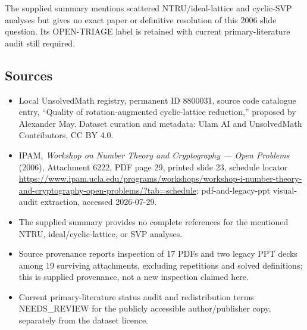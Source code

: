 \documentclass[11pt]{article}
\begin{document}
The supplied summary mentions scattered NTRU/ideal-lattice and cyclic-SVP analyses but gives no exact paper or definitive resolution of this 2006 slide question. Its OPEN-TRIAGE label is retained with current primary-literature audit still required.
\subsection{Sources}
\begin{itemize}
\item Local UnsolvedMath registry, permanent ID 8800031, source code catalogue entry, ``Quality of rotation-augmented cyclic-lattice reduction,'' proposed by Alexander May. Dataset curation and metadata: Ulam AI and UnsolvedMath Contributors, CC BY 4.0.
\item IPAM, \emph{Workshop on Number Theory and Cryptography --- Open Problems} (2006), Attachment 6222, PDF page 29, printed slide 23, schedule locator \url{https://www.ipam.ucla.edu/programs/workshops/workshop-i-number-theory-and-cryptography-open-problems/?tab=schedule}; pdf-and-legacy-ppt visual-audit extraction, accessed 2026-07-29.
\item The supplied summary provides no complete references for the mentioned NTRU, ideal/cyclic-lattice, or SVP analyses.
\item Source provenance reports inspection of 17 PDFs and two legacy PPT decks among 19 surviving attachments, excluding repetitions and solved definitions; this is supplied provenance, not a new inspection claimed here.
\item Current primary-literature status audit and redistribution terms NEEDS\_REVIEW for the publicly accessible author/publisher copy, separately from the dataset licence.
\end{itemize}
\end{document}
